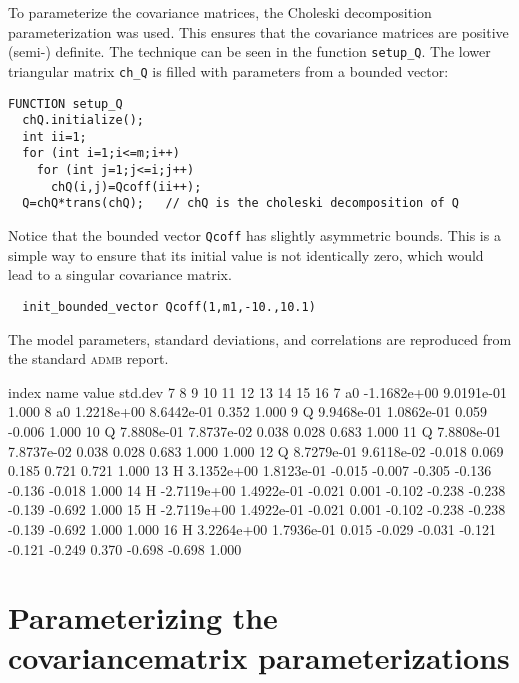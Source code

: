 To parameterize the covariance matrices, the Choleski decomposition
parameterization was used. This ensures that the covariance matrices are
positive (semi-) definite. The technique can be seen in the function
\texttt{setup\_Q}. 
The lower triangular matrix \texttt{ch\_Q} is filled with parameters
from a bounded vector:
\begin{lstlisting}
FUNCTION setup_Q
  chQ.initialize();
  int ii=1;
  for (int i=1;i<=m;i++)
    for (int j=1;j<=i;j++)
      chQ(i,j)=Qcoff(ii++);
  Q=chQ*trans(chQ);   // chQ is the choleski decomposition of Q 
\end{lstlisting}
Notice that the bounded vector \texttt{Qcoff} has slightly asymmetric
bounds. This is a simple way to ensure that its initial value is not
identically zero, which would lead to a singular covariance matrix.
\begin{lstlisting}
  init_bounded_vector Qcoff(1,m1,-10.,10.1)
\end{lstlisting}

The model parameters, standard deviations, and 
correlations are reproduced from the
standard \textsc{admb} report.

\begin{smallcode}
 index   name    value      std.dev    7      8      9     10     11     12     13     14     15      16   
    7   a0    -1.1682e+00 9.0191e-01  1.000
    8   a0     1.2218e+00 8.6442e-01  0.352  1.000
    9   Q      9.9468e-01 1.0862e-01  0.059 -0.006  1.000
   10   Q      7.8808e-01 7.8737e-02  0.038  0.028  0.683  1.000
   11   Q      7.8808e-01 7.8737e-02  0.038  0.028  0.683  1.000  1.000
   12   Q      8.7279e-01 9.6118e-02 -0.018  0.069  0.185  0.721  0.721  1.000
   13   H      3.1352e+00 1.8123e-01 -0.015 -0.007 -0.305 -0.136 -0.136 -0.018  1.000
   14   H     -2.7119e+00 1.4922e-01 -0.021  0.001 -0.102 -0.238 -0.238 -0.139 -0.692  1.000
   15   H     -2.7119e+00 1.4922e-01 -0.021  0.001 -0.102 -0.238 -0.238 -0.139 -0.692  1.000  1.000
   16   H      3.2264e+00 1.7936e-01  0.015 -0.029 -0.031 -0.121 -0.121 -0.249  0.370 -0.698 -0.698  1.000
\end{smallcode}


\section{Parameterizing the covariance\br matrix parameterizations}

